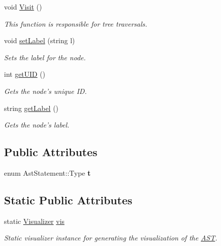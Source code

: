 \begin{DoxyCompactItemize}
\item 
void \hyperlink{classAstStatement_a1f1570931e373fe2f1e18ce417236ee4}{Visit} ()
\begin{DoxyCompactList}\small\item\em This function is responsible for tree traversals. \end{DoxyCompactList}\item 
void \hyperlink{classAST_a71d680856e95ff89f55d5311a552eba6}{set\-Label} (string l)
\begin{DoxyCompactList}\small\item\em Sets the label for the node. \end{DoxyCompactList}\item 
int \hyperlink{classAST_ab7a5b1d9f1c2de0d98deb356f724a42c}{get\-U\-I\-D} ()
\begin{DoxyCompactList}\small\item\em Gets the node's unique I\-D. \end{DoxyCompactList}\item 
string \hyperlink{classAST_aee029be902fffc927d16ccb03eb922ad}{get\-Label} ()
\begin{DoxyCompactList}\small\item\em Gets the node's label. \end{DoxyCompactList}\end{DoxyCompactItemize}
\subsection*{Public Attributes}
\begin{DoxyCompactItemize}
\item 
\hypertarget{classAstStatement_a31c4d9fe3f321bdb8e14d20b22a91151}{enum Ast\-Statement\-::\-Type {\bfseries t}}\label{classAstStatement_a31c4d9fe3f321bdb8e14d20b22a91151}

\end{DoxyCompactItemize}
\subsection*{Static Public Attributes}
\begin{DoxyCompactItemize}
\item 
\hypertarget{classAST_aca9e6637209b31e03a09c0d42f29bdfa}{static \hyperlink{classVisualizer}{Visualizer} \hyperlink{classAST_aca9e6637209b31e03a09c0d42f29bdfa}{vis}}\label{classAST_aca9e6637209b31e03a09c0d42f29bdfa}

\begin{DoxyCompactList}\small\item\em Static visualizer instance for generating the visualization of the \hyperlink{classAST}{A\-S\-T}. \end{DoxyCompactList}\end{DoxyCompactItemize}

